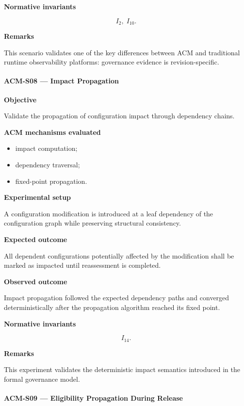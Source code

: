 \documentclass[10pt]{article}
\begin{document}
\textbf{Normative invariants}

\[
I_2,\;
I_{10}.
\]

\textbf{Remarks}

This scenario validates one of the key differences between ACM and traditional
runtime observability platforms: governance evidence is revision-specific.

\paragraph{ACM-S08 --- Impact Propagation}

\textbf{Objective}

Validate the propagation of configuration impact through dependency chains.

\textbf{ACM mechanisms evaluated}

\begin{itemize}
    \item impact computation;
    \item dependency traversal;
    \item fixed-point propagation.
\end{itemize}

\textbf{Experimental setup}

A configuration modification is introduced at a leaf dependency of the
configuration graph while preserving structural consistency.

\textbf{Expected outcome}

All dependent configurations potentially affected by the modification shall be
marked as impacted until reassessment is completed.

\textbf{Observed outcome}

Impact propagation followed the expected dependency paths and converged
deterministically after the propagation algorithm reached its fixed point.

\textbf{Normative invariants}

\[
I_{14}.
\]

\textbf{Remarks}

This experiment validates the deterministic impact semantics introduced in the
formal governance model.

\paragraph{ACM-S09 --- Eligibility Propagation During Release}
\end{document}

